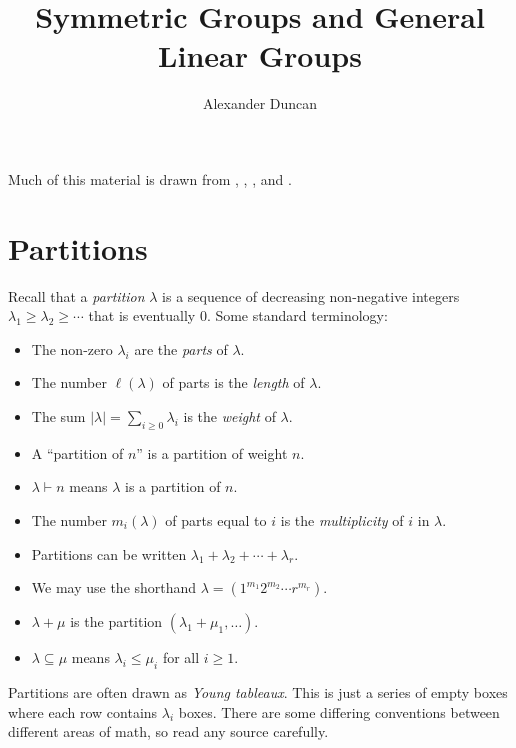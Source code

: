 \documentclass[12pt]{article}
\theoremstyle{plain}
\theoremstyle{definition}
\theoremstyle{remark}
\numberwithin{equation}{section}
\begin{document}
\title{Symmetric Groups and General Linear Groups}
\author{Alexander Duncan}

\maketitle

Much of this material is drawn from
\cite[\S{4,6,A}]{FultonHarris},
\cite[\S{5.12--5.19}]{Etingof},
\cite[\S{I}]{Macdonald}, and
\cite[\S{7}]{Stanley2}.


\section{Partitions}

Recall that a \emph{partition} $\lambda$ is a sequence of decreasing
non-negative integers
$\lambda_1 \ge \lambda_2 \ge \cdots$ that is eventually $0$.
Some standard terminology:
\begin{itemize}
\item The non-zero $\lambda_i$ are the \emph{parts} of $\lambda$.
\item The number $\ell(\lambda)$ of parts is the \emph{length} of $\lambda$.
\item The sum $|\lambda|=\sum_{i \ge 0} \lambda_i$ is the \emph{weight} of $\lambda$.
\item A ``partition of $n$'' is a partition of weight $n$.
\item $\lambda \vdash n$ means $\lambda$ is a partition of $n$.
\item The number $m_i(\lambda)$ of parts equal to $i$ is
the \emph{multiplicity} of $i$ in $\lambda$.
\item Partitions can be written $\lambda_1 + \lambda_2 + \cdots + \lambda_r$.
\item We may use the shorthand $\lambda = (1^{m_1} 2^{m_2} \cdots r^{m_r})$.
\item $\lambda+\mu$ is the partition $(\lambda_1+\mu_1, \ldots)$.
\item $\lambda \subseteq \mu$ means $\lambda_i \le \mu_i$ for all $i \ge 1$.
\end{itemize}

Partitions are often drawn as \emph{Young tableaux}.  This is just a
series of empty boxes where each row contains $\lambda_i$ boxes.
There are some differing conventions between different areas of math, so
read any source carefully.
\end{document}
